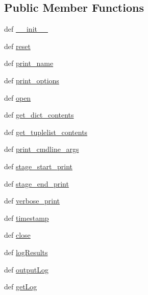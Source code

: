\subsection*{Public Member Functions}
\begin{DoxyCompactItemize}
\item 
def \hyperlink{classLogger_1_1Logger_aff6a8050c4529cf59be26d70e487aba9}{\-\_\-\-\_\-init\-\_\-\-\_\-}
\item 
def \hyperlink{classLogger_1_1Logger_a13e2a87babf570a4524a9a0e505ba396}{reset}
\item 
def \hyperlink{classLogger_1_1Logger_a3ec2e17d92bb034c1e4f1e11ec7c2522}{print\-\_\-name}
\item 
def \hyperlink{classLogger_1_1Logger_aa6ca87386f752414ada5cc84daa1bfd4}{print\-\_\-options}
\item 
def \hyperlink{classLogger_1_1Logger_a009dfacca4ae352cc05a7e8307d8ecb5}{open}
\item 
def \hyperlink{classLogger_1_1Logger_a10141d585df905bec94bedf85a8eb976}{get\-\_\-dict\-\_\-contents}
\item 
def \hyperlink{classLogger_1_1Logger_a51264c10e6b8e89921d3e9f1f803a350}{get\-\_\-tuplelist\-\_\-contents}
\item 
def \hyperlink{classLogger_1_1Logger_a3779c396f867ec4bd7ec73864990e8de}{print\-\_\-cmdline\-\_\-args}
\item 
def \hyperlink{classLogger_1_1Logger_a10165baedbbebdc49c449237e518edb8}{stage\-\_\-start\-\_\-print}
\item 
def \hyperlink{classLogger_1_1Logger_a2f203cbc01e4de98b5eab3e5c9d9709f}{stage\-\_\-end\-\_\-print}
\item 
def \hyperlink{classLogger_1_1Logger_a8c05e25fb36679fae21ab8910eb6d117}{verbose\-\_\-print}
\item 
def \hyperlink{classLogger_1_1Logger_abdeac14fe7d313f6a4d2788ec7652ce2}{timestamp}
\item 
def \hyperlink{classLogger_1_1Logger_a8ee3d433a755c789820bd9188824debc}{close}
\item 
def \hyperlink{classLogger_1_1Logger_a119a7a5e59e77d9cced01057bdd8d493}{log\-Results}
\item 
def \hyperlink{classLogger_1_1Logger_ac50b7479c5c0f15b94ae311774600cd7}{output\-Log}
\item 
def \hyperlink{classLogger_1_1Logger_af565e7da19e56f4f4ff0e1f88b172394}{get\-Log}
\end{DoxyCompactItemize}
